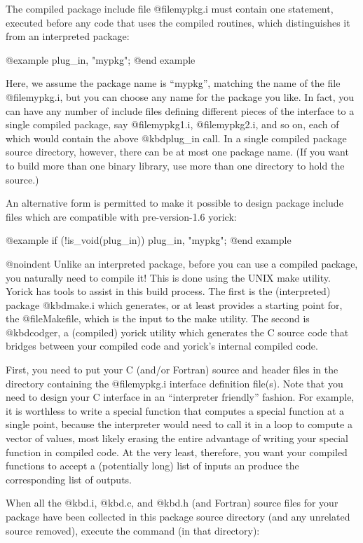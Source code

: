 The compiled package include file @file{mypkg.i} must contain one
statement, executed before any code that uses the compiled routines,
which distinguishes it from an interpreted package:

@example
plug_in, "mypkg";
@end example

Here, we assume the package name is ``mypkg'', matching the name of
the file @file{mypkg.i}, but you can choose any name for the package
you like.  In fact, you can have any number of include files defining
different pieces of the interface to a single compiled package, say
@file{mypkg1.i}, @file{mypkg2.i}, and so on, each of which would
contain the above @kbd{plug_in} call.  In a single compiled package
source directory, however, there can be at most one package name.  (If
you want to build more than one binary library, use more than one
directory to hold the source.)

An alternative form is permitted to make it possible to design package
include files which are compatible with pre-version-1.6 yorick:

@example
if (!is_void(plug_in)) plug_in, "mypkg";
@end example

@noindent
Unlike an interpreted package, before you can use a compiled package,
you naturally need to compile it!  This is done using the UNIX make
utility.  Yorick has tools to assist in this build process.  The first
is the (interpreted) package @kbd{make.i} which generates, or at least
provides a starting point for, the @file{Makefile}, which is the input
to the make utility.  The second is @kbd{codger}, a (compiled) yorick
utility which generates the C source code that bridges between your
compiled code and yorick's internal compiled code.

First, you need to put your C (and/or Fortran) source and header files
in the directory containing the @file{mypkg.i} interface definition
file(s).  Note that you need to design your C interface in an
``interpreter friendly'' fashion.  For example, it is worthless to
write a special function that computes a special function at a single
point, because the interpreter would need to call it in a loop to
compute a vector of values, most likely erasing the entire advantage
of writing your special function in compiled code.  At the very least,
therefore, you want your compiled functions to accept a (potentially
long) list of inputs an produce the corresponding list of outputs.

When all the @kbd{.i}, @kbd{.c}, and @kbd{.h} (and Fortran) source
files for your package have been collected in this package source
directory (and any unrelated source removed), execute the command
(in that directory):

